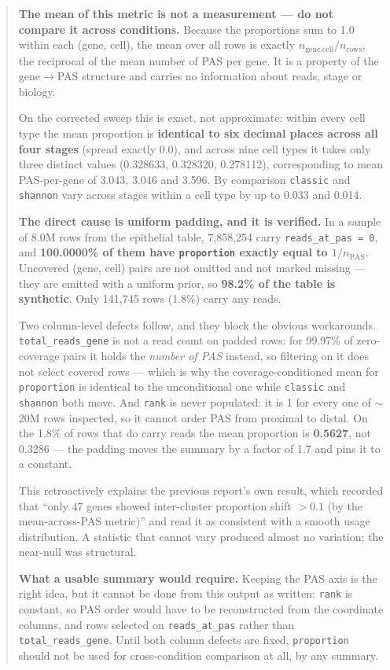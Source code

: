 \documentclass[11pt,a4paper]{article}
\begin{document}
\begin{quote}
\textbf{The mean of this metric is not a measurement --- do not compare it across
conditions.} Because the proportions sum to 1.0 within each (gene, cell), the mean
over all rows is exactly $n_{\text{gene,cell}} / n_{\text{rows}}$, the reciprocal
of the mean number of PAS per gene. It is a property of the gene$\rightarrow$PAS
structure and carries no information about reads, stage or biology.

On the corrected sweep this is exact, not approximate: within every cell type the
mean proportion is \textbf{identical to six decimal places across all four
stages} (spread exactly 0.0), and across nine cell types it takes only three
distinct values (0.328633, 0.328320, 0.278112), corresponding to mean
PAS-per-gene of 3.043, 3.046 and 3.596. By comparison \texttt{classic} and
\texttt{shannon} vary across stages within a cell type by up to 0.033 and 0.014.

\textbf{The direct cause is uniform padding, and it is verified.} In a sample of
8.0M rows from the epithelial table, 7,858,254 carry \texttt{reads\_at\_pas = 0},
and \textbf{100.0000\% of them have \texttt{proportion} exactly equal to
$1/n_{\text{PAS}}$}. Uncovered (gene, cell) pairs are not omitted and not marked
missing --- they are emitted with a uniform prior, so \textbf{98.2\% of the table
is synthetic}. Only 141,745 rows (1.8\%) carry any reads.

Two column-level defects follow, and they block the obvious workarounds.
\texttt{total\_reads\_gene} is not a read count on padded rows: for 99.97\% of
zero-coverage pairs it holds the \emph{number of PAS} instead, so filtering on it
does not select covered rows --- which is why the coverage-conditioned mean for
\texttt{proportion} is identical to the unconditional one while \texttt{classic}
and \texttt{shannon} both move. And \texttt{rank} is never populated: it is 1 for
every one of $\sim$20M rows inspected, so it cannot order PAS from proximal to
distal. On the 1.8\% of rows that do carry reads the mean proportion is
\textbf{0.5627}, not 0.3286 --- the padding moves the summary by a factor of 1.7
and pins it to a constant.

This retroactively explains the previous report's own result, which recorded that
``only 47 genes showed inter-cluster proportion shift $>0.1$ (by the
mean-across-PAS metric)'' and read it as consistent with a smooth usage
distribution. A statistic that cannot vary produced almost no variation; the
near-null was structural.

\textbf{What a usable summary would require.} Keeping the PAS axis is the right
idea, but it cannot be done from this output as written: \texttt{rank} is
constant, so PAS order would have to be reconstructed from the coordinate columns,
and rows selected on \texttt{reads\_at\_pas} rather than
\texttt{total\_reads\_gene}. Until both column defects are fixed,
\texttt{proportion} should not be used for cross-condition comparison at all, by
any summary.
\end{quote}
\end{document}
